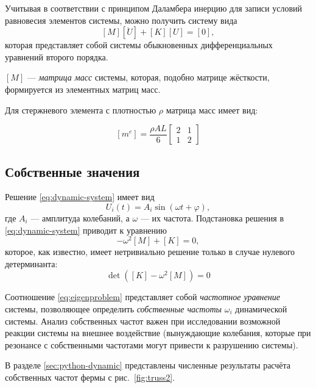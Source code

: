 \documentclass[10pt]{article}
\numberwithin{equation}{section}
\renewcommand{\phi}{\varphi}
\newcommand{\neword}{\emph}
\newcommand{\matr}[1]{[#1]}
\newcommand{\figref}[1]{рис. \ref{#1}}
\begin{document}
Учитывая в соответствии с принципом Даламбера инерцию для записи
условий равновесия элементов системы, можно получить систему вида
\begin{equation}
  \label{eq:dynamic-system}
  \matr{M}\matr{\ddot{U}} + \matr{K}\matr{U} = \matr{0},
\end{equation}
которая представляет собой системы обыкновенных дифференциальных
уравнений второго порядка.

$\matr{M}$ — \neword{матрица масс} системы, которая, подобно матрице
жёсткости, формируется из элементных матриц масс.

Для стержневого элемента с плотностью $\rho$ матрица масс имеет вид:

\begin{equation}
  \label{eq:bar-mass}
  \matr{m^e} = \frac{\rho AL}{6}
  \begin{bmatrix}
    2&1\\
    1&2
  \end{bmatrix}
\end{equation}

\subsection{Собственные значения}

Решение \eqref{eq:dynamic-system} имеет вид
\begin{equation*}
U_i (t) = A_i \sin(\omega t + \phi),
\end{equation*}
где $A_i$ — амплитуда колебаний, а $\omega$ — их частота. Подстановка
решения в \eqref{eq:dynamic-system} приводит к уравнению
\begin{equation*}
  -\omega^2 \matr{M} + \matr{K} = 0,
\end{equation*}
которое, как известно, имеет нетривиально решение только в случае
нулевого детерминанта:
\begin{equation}
  \label{eq:eigenproblem}
  \det(\matr{K}-\omega^2\matr{M}) = 0
\end{equation}

Соотношение \eqref{eq:eigenproblem} представляет собой
\neword{частотное уравнение} системы, позволяющее определить
\neword{собственные частоты} ${\omega_i}$ динамической системы. Анализ
собственных частот важен при исследовании возможной реакции системы на
внешнее воздействие (вынуждающие колебания, которые при резонансе с
собственными частотами могут привести к разрушению системы).

В разделе \ref{sec:python-dynamic} представлены численные результаты
расчёта собственных частот фермы с \figref{fig:truss2}.
\end{document}
